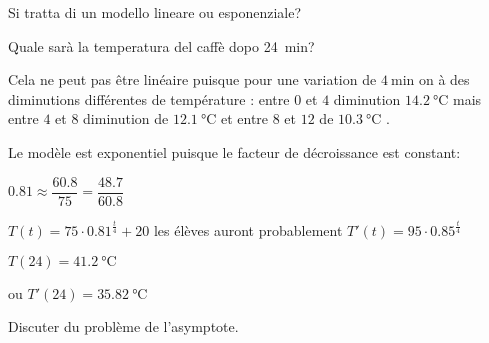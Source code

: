 \begin{questions}
{Si tratta di un modello lineare ou esponenziale?

Quale sarà la temperatura del caffè dopo \SI{24}{\minute}?
}



\begin{profonly}
Cela ne peut pas être linéaire puisque pour une variation de  $\SI{4}{\minute}$ on à des diminutions différentes de température : entre $0$ et $4$ diminution $\SI{14.2}{\degreeCelsius}$ mais entre $4$ et $8$ diminution de $\SI{12.1}{\degreeCelsius}$  et entre $8$ et $12$ de $\SI{10.3}{\degreeCelsius}$ .

Le modèle est exponentiel puisque le facteur de décroissance est constant:

$0.81 \approx \dfrac{60.8}{75}=\dfrac{48.7}{60.8}$

$T(t)= 75 \cdot 0.81^\frac{t}{4}+20$  les élèves auront probablement $T'(t)=95 \cdot 0.85^\frac{t}{4}$

$T(24)=\SI{41.2}{\degreeCelsius}$ 

ou $T'(24)=\SI{35.82}{\degreeCelsius}$ 

Discuter du problème de l'asymptote.
\end{profonly}

\exnewpage
\question 
{}



\question
{}
\end{questions}
